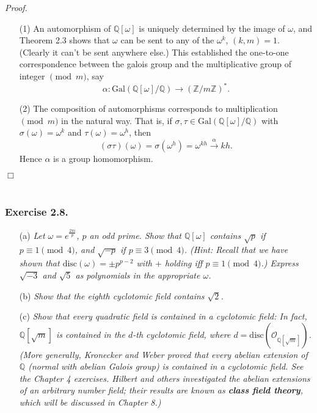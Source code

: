 \documentclass{article}
\begin{document}
\emph{Proof.}
\begin{enumerate}
\item[(1)]
  An automorphism of $\mathbb{Q}[\omega]$ is uniquely determined by the image of $\omega$,
  and Theorem 2.3 shows that $\omega$ can be sent to any of the $\omega^k$, $(k,m) = 1$.
  (Clearly it can't be sent anywhere else.)
  This established the one-to-one correspondence between the galois group and
  the multiplicative group of integer $\pmod m$, say
  \[
    \alpha: \mathrm{Gal}(\mathbb{Q}[\omega]/\mathbb{Q})
    \to (\mathbb{Z}/m\mathbb{Z})^{*}.
  \]

\item[(2)]
  The composition of automorphisms corresponds to multiplication $\pmod m$ in the natural way.
  That is, if $\sigma, \tau \in \mathrm{Gal}(\mathbb{Q}[\omega]/\mathbb{Q})$
  with $\sigma(\omega) = \omega^k$ and $\tau(\omega) = \omega^h$,
  then
  \[
    (\sigma\tau)(\omega) = \sigma(\omega^h) = \omega^{kh}
    \xrightarrow{\alpha} kh.
  \]
  Hence $\alpha$ is a group homomorphism.
\end{enumerate}
$\Box$ \\\\






\subsubsection*{Exercise 2.8.}
\begin{enumerate}
\item[(a)]
  \emph{Let $\omega = e^{\frac{2\pi i}{p}}$, $p$ an odd prime.
  Show that $\mathbb{Q}[\omega]$ contains $\sqrt{p}$ if $p \equiv 1 \pmod{4}$,
  and $\sqrt{-p}$ if $p \equiv 3 \pmod{4}$.
  (Hint: Recall that we have shown that $\mathrm{disc}(\omega) = \pm p^{p-2}$ with $+$ holding
  iff $p \equiv 1 \pmod{4}$.)
  Express $\sqrt{-3}$ and $\sqrt{5}$ as polynomials in the appropriate $\omega$.}

\item[(b)]
  \emph{Show that the eighth cyclotomic field contains $\sqrt{2}$.}

\item[(c)]
  \emph{Show that every quadratic field is contained in a cyclotomic field:
  In fact, $\mathbb{Q}[\sqrt{m}]$ is contained in the $d$-th cyclotomic field,
  where $d = \mathrm{disc}(\mathcal{O}_{\mathbb{Q}[\sqrt{m}]})$.
  (More generally, Kronecker and Weber proved that every abelian extension of $\mathbb{Q}$
  (normal with abelian Galois group) is contained in a cyclotomic field.
  See the Chapter 4 exercises.
  Hilbert and others investigated the abelian extensions of an arbitrary number field;
  their results are known as \textbf{class field theory}, which will be discussed in Chapter 8.)} \\
\end{enumerate}
\end{document}
